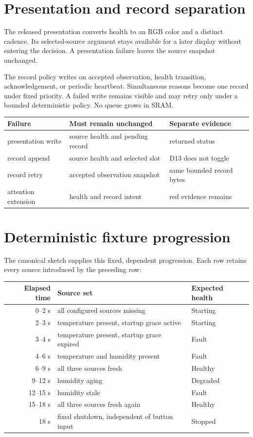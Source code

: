 \documentclass[11pt]{article}
\begin{document}
\section{Presentation and record separation}

The released presentation converts health to an RGB color and a distinct
cadence. Its selected-source argument stays available for a later display
without entering the decision. A presentation failure leaves the source
snapshot unchanged.

The record policy writes on accepted observation, health transition,
acknowledgement, or periodic heartbeat. Simultaneous reasons become one record
under fixed priority. A failed write remains visible and may retry only under a
bounded deterministic policy. No queue grows in SRAM.

\begin{tabularx}{\linewidth}{@{}l X X@{}}
\toprule
Failure & Must remain unchanged & Separate evidence\\
\midrule
presentation write & source health and pending record & returned status\\
record append & source health and selected slot & D13 does not toggle\\
record retry & accepted observation snapshot & same bounded record bytes\\
attention extension & health and record intent & red evidence remains\\
\bottomrule
\end{tabularx}

\section{Deterministic fixture progression}

The canonical sketch supplies this fixed, dependent progression. Each row
retains every source introduced by the preceding row:

\begin{tabularx}{\linewidth}{@{}r X l@{}}
\toprule
Elapsed time & Source set & Expected health\\
\midrule
0--2 s & all configured sources missing & Starting\\
2--3 s & temperature present, startup grace active & Starting\\
3--4 s & temperature present, startup grace expired & Fault\\
4--6 s & temperature and humidity present & Fault\\
6--9 s & all three sources fresh & Healthy\\
9--12 s & humidity aging & Degraded\\
12--15 s & humidity stale & Fault\\
15--18 s & all three sources fresh again & Healthy\\
18 s & fixed shutdown, independent of button input & Stopped\\
\bottomrule
\end{tabularx}
\end{document}
